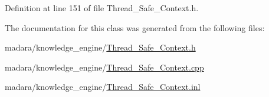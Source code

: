 Definition at line 151 of file Thread\_\-Safe\_\-Context.h.



The documentation for this class was generated from the following files:\begin{DoxyCompactItemize}
\item 
madara/knowledge\_\-engine/\hyperlink{Thread__Safe__Context_8h}{Thread\_\-Safe\_\-Context.h}\item 
madara/knowledge\_\-engine/\hyperlink{Thread__Safe__Context_8cpp}{Thread\_\-Safe\_\-Context.cpp}\item 
madara/knowledge\_\-engine/\hyperlink{Thread__Safe__Context_8inl}{Thread\_\-Safe\_\-Context.inl}\end{DoxyCompactItemize}

